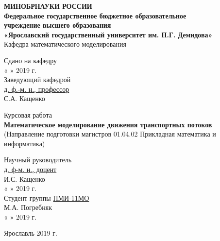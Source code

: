\documentclass[12pt, a4paper]{extarticle}
\numberwithin{equation}{section}
\begin{document}
\thispagestyle{empty} 
\medskip 

\begin{center} 
	\textbf{МИНОБРНАУКИ РОССИИ\\ 
		\vspace{0.5cm} 
		Федеральное государственное бюджетное образовательное\\ 
		учреждение высшего образования\\ 
		«Ярославский государственный университет им. П.Г. Демидова»}\\ 
	\vspace{0.5cm} 
	{Кафедра математического моделирования}\\ 
	\vspace{1.5cm} 
	
\end{center}
\begin{flushright} 
	Сдано на кафедру\\
	« 
	\underline{\phantom{aaa}} 
	» 
	\underline{\phantom{aaaaaaaaaaaaa}} 2019 г.\\ 
	Заведующий кафедрой\\
	\underline{\phantom{aaa}д. ф.-м. н., профессор\phantom{aaa}}\\ 
	\vspace{0.1cm} 
	\underline{\phantom{aaaaaaaaaaaaa}} С.А. Кащенко
\end{flushright}
\vspace{3cm} 
\begin{center} 
	Курсовая работа\\ 
	\vspace{0.5cm} 
	\textbf{Математическое моделирование движения транспортных потоков}\\ 
	\small{(Направление подготовки магистров 01.04.02 Прикладная математика и информатика)}
	\vspace{3cm} 
\end{center} 

\begin{flushright} 
	Научный руководитель\\ 
	\underline{\phantom{aaa}д. ф-м. н., доцент\phantom{aaa}}\\ 
	\vspace{0.1cm} 
	\underline{\phantom{aaaaaaaaaaaaa}} И.С. Кащенко\\ 
	« 
	\underline{\phantom{aaa}} 
	» 
	\underline{\phantom{aaaaaaaaaaaaa}} 2019 г.\\ 
	\vspace{0.5cm} 
	Студент группы \underline{\phantom{a}ПМИ-11МО\phantom{a}}\\ 
	\vspace{0.1cm} 
	\underline{\phantom{aaaaaaaaaaaaa}} М.А. Погребняк\\ 
	« 
	\underline{\phantom{aaa}} 
	» 
	\underline{\phantom{aaaaaaaaaaaaaa}}2019 г.\\ 
	\vspace{1cm} 
\end{flushright} 
\begin{center} 
	Ярославль 2019 г.
	\vspace{-1cm}  
\end{center} 
\end{document}

